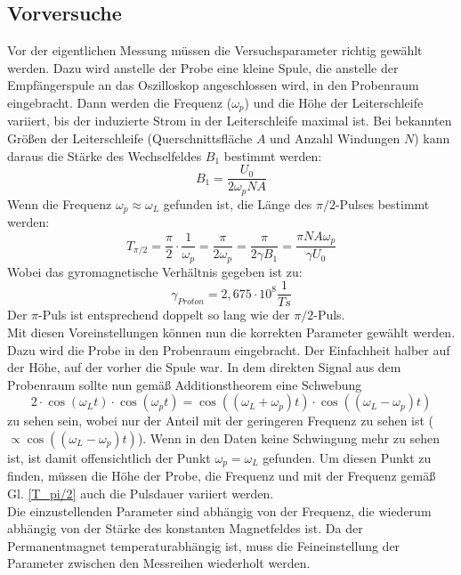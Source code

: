 \documentclass[12pt,a4paper]{article}
\begin{document}
\subsection{Vorversuche}
Vor der eigentlichen Messung müssen die Versuchsparameter richtig gewählt werden. Dazu wird anstelle der Probe eine kleine Spule, die anstelle der Empfängerspule an das Oszilloskop angeschlossen wird, in den Probenraum eingebracht. Dann werden die Frequenz ($\omega _p$) und die Höhe der Leiterschleife variiert, bis der induzierte Strom in der Leiterschleife maximal ist. Bei bekannten Größen der Leiterschleife (Querschnittsfläche $A$ und Anzahl Windungen $N$) kann daraus die Stärke des Wechselfeldes $B_1$ bestimmt werden:
\begin{equation*}
B_1 = \dfrac{U_0}{2 \omega _p N A}
\end{equation*}
Wenn die Frequenz $\omega _p \approx \omega _L$ gefunden ist, die Länge des $\pi /2$-Pulses bestimmt werden:
\begin{equation}
\label{T_pi/2}
T_{\pi /2} = \dfrac{\pi}{2} \cdot \dfrac{1}{\omega _p} = \dfrac{\pi}{2 \omega _p} = \dfrac{\pi}{2 \gamma B_1} = \dfrac{\pi N A \omega _p}{\gamma U_0}
\end{equation}
Wobei das gyromagnetische Verhältnis gegeben ist zu:
\begin{equation*}
\gamma _{Proton} = 2,675 \cdot 10^{8} \dfrac{1}{T s} 
\end{equation*}
Der $\pi$-Puls ist entsprechend doppelt so lang wie der $\pi /2$-Puls.\\
Mit diesen Voreinstellungen können nun die korrekten Parameter gewählt werden. Dazu wird die Probe in den Probenraum eingebracht. Der Einfachheit halber auf der Höhe, auf der vorher die Spule war. In dem direkten Signal aus dem Probenraum sollte nun gemäß Additionstheorem eine Schwebung
\begin{equation*}
2 \cdot \cos (\omega _L t) \cdot \cos (\omega _p t) = \cos ((\omega _L + \omega _p) t) \cdot \cos ((\omega _L - \omega _p) t)
\end{equation*}
zu sehen sein, wobei nur der Anteil mit der geringeren Frequenz zu sehen ist ($\propto \cos ((\omega _L - \omega _p) t)$). Wenn in den Daten keine Schwingung mehr zu sehen ist, ist damit offensichtlich der Punkt $\omega _p = \omega _L$ gefunden. Um diesen Punkt zu finden, müssen die Höhe der Probe, die Frequenz und mit der Frequenz gemäß Gl. \ref{T_pi/2} auch die Pulsdauer variiert werden.\\
Die einzustellenden Parameter sind abhängig von der Frequenz, die wiederum abhängig von der Stärke des konstanten Magnetfeldes ist. Da der Permanentmagnet temperaturabhängig ist, muss die Feineinstellung der Parameter zwischen den Messreihen wiederholt werden.
\end{document}
